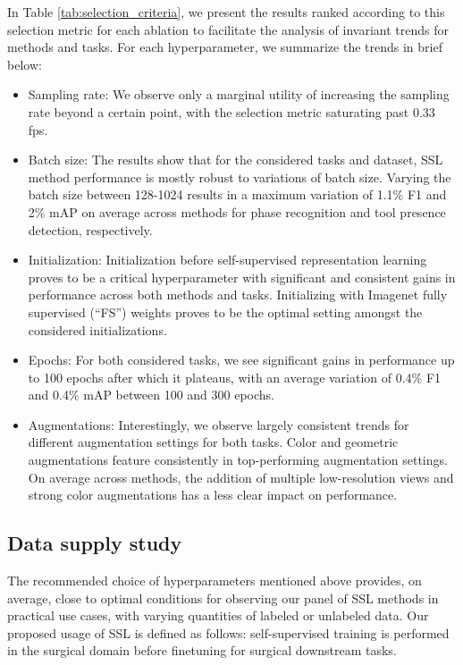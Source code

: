 \documentclass[times,twocolumn,final]{elsarticle}
\begin{document}
In Table \ref{tab:selection_criteria}, we present the results ranked according to this selection metric for each ablation to facilitate the analysis of invariant trends for methods and tasks. For each hyperparameter, we summarize the trends in brief below:
\begin{itemize}
  \item Sampling rate: We observe only a marginal utility of increasing the sampling rate beyond a certain point, with the selection metric saturating past 0.33 fps.
  \item Batch size: The results show that for the considered tasks and dataset, SSL method performance is mostly robust to variations of batch size. Varying the batch size between 128-1024 results in a maximum variation of 1.1\% F1 and 2\% mAP on average across methods for phase recognition and tool presence detection, respectively. 
  \item Initialization: Initialization before self-supervised representation learning proves to be a critical hyperparameter with significant and consistent gains in performance across both methods and tasks. Initializing with Imagenet fully supervised (``FS'') weights proves to be the optimal setting amongst the considered initializations.
  \item Epochs: For both considered tasks, we see significant gains in performance up to 100 epochs after which it plateaus, with an average variation of 0.4\% F1 and 0.4\% mAP between 100 and 300 epochs.
  \item Augmentations: Interestingly, we observe largely consistent trends for different augmentation settings for both tasks. Color and geometric augmentations feature consistently in top-performing augmentation settings. On average across methods, the addition of multiple low-resolution views and strong color augmentations has a less clear impact on performance. 
\end{itemize}

\subsection{Data supply study}
The recommended choice of hyperparameters mentioned above provides, on average, close to optimal conditions for observing our panel of SSL methods in practical use cases, with varying quantities of labeled or unlabeled data. Our proposed usage of SSL is defined as follows: self-supervised training is performed in the surgical domain before finetuning for surgical downstream tasks.
\end{document}
